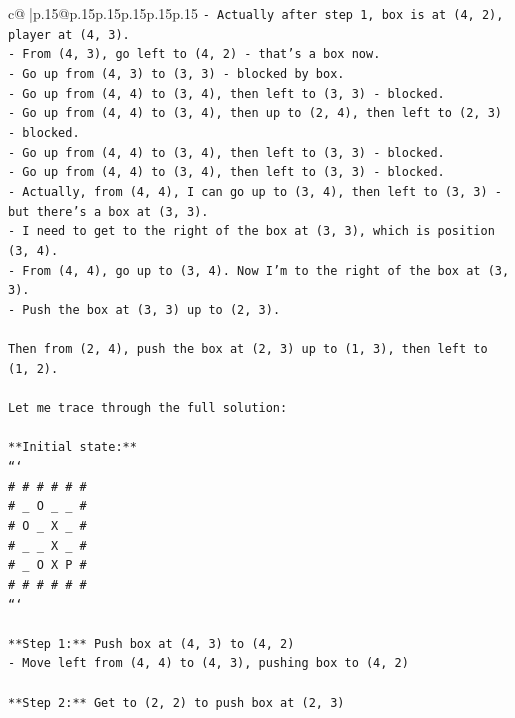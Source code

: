 \documentclass{article}
\begin{document}
{\begin{supertabular}{c@{$\;$}|p{.15\linewidth}@{}p{.15\linewidth}p{.15\linewidth}p{.15\linewidth}p{.15\linewidth}p{.15\linewidth}}
{{{\texttt{{-} Actually after step 1, box is at (4, 2), player at (4, 3).} \\
\texttt{{-} From (4, 3), go left to (4, 2) {-} that's a box now.} \\
\texttt{{-} Go up from (4, 3) to (3, 3) {-} blocked by box.} \\
\texttt{{-} Go up from (4, 4) to (3, 4), then left to (3, 3) {-} blocked.} \\
\texttt{{-} Go up from (4, 4) to (3, 4), then up to (2, 4), then left to (2, 3) {-} blocked.} \\
\texttt{{-} Go up from (4, 4) to (3, 4), then left to (3, 3) {-} blocked.} \\
\texttt{{-} Go up from (4, 4) to (3, 4), then left to (3, 3) {-} blocked.} \\
\texttt{{-} Actually, from (4, 4), I can go up to (3, 4), then left to (3, 3) {-} but there's a box at (3, 3).} \\
\texttt{{-} I need to get to the right of the box at (3, 3), which is position (3, 4).} \\
\texttt{{-} From (4, 4), go up to (3, 4). Now I'm to the right of the box at (3, 3).} \\
\texttt{{-} Push the box at (3, 3) up to (2, 3).} \\
\\ 
\texttt{Then from (2, 4), push the box at (2, 3) up to (1, 3), then left to (1, 2).} \\
\\ 
\texttt{Let me trace through the full solution:} \\
\\ 
\texttt{**Initial state:**} \\
\texttt{```} \\
\texttt{\# \# \# \# \# \#} \\
\texttt{\# \_ O \_ \_ \#} \\
\texttt{\# O \_ X \_ \#} \\
\texttt{\# \_ \_ X \_ \#} \\
\texttt{\# \_ O X P \#} \\
\texttt{\# \# \# \# \# \#} \\
\texttt{```} \\
\\ 
\texttt{**Step 1:** Push box at (4, 3) to (4, 2)} \\
\texttt{{-} Move left from (4, 4) to (4, 3), pushing box to (4, 2)} \\
\\ 
\texttt{**Step 2:** Get to (2, 2) to push box at (2, 3)} \\
}}}
\end{supertabular}}
\end{document}
